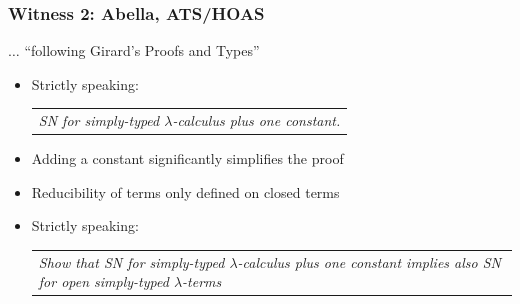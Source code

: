 \documentclass{beamer}
\begin{document}
\begin{frame}\frametitle{Witness 2: Abella, ATS/HOAS}\relax%
$\ldots$ ``following Girard's Proofs and Types''
\pause

\begin{itemize}
%
\item Strictly speaking:%
\begin{center}
\begin{tabular}{p{10cm}}
\emph{SN for simply-typed $\lambda$-calculus plus one constant.}
\end{tabular}
\end{center}

\item Adding a constant significantly simplifies the proof
\item Reducibility of terms only defined on closed terms
\\[1ex]
\item Strictly speaking:
\begin{center}
\begin{tabular}{p{10cm}}
\emph{Show that SN for simply-typed $\lambda$-calculus plus one
  constant implies also SN for open simply-typed $\lambda$-terms}
\end{tabular}
\end{center}
\end{itemize}

\end{frame}
\end{document}
